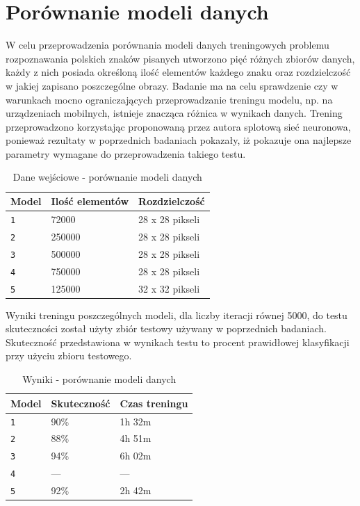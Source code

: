\documentclass[brudnopis]{xmgr}
\begin{document}
\section{Porównanie modeli danych}

W celu przeprowadzenia porównania modeli danych treningowych problemu rozpoznawania polskich znaków pisanych utworzono pięć różnych zbiorów danych, każdy z nich posiada określoną ilość elementów każdego znaku oraz rozdzielczość w jakiej zapisano poszczególne obrazy. Badanie ma na celu sprawdzenie czy w warunkach mocno ograniczających przeprowadzanie treningu modelu, np. na urządzeniach mobilnych, istnieje znacząca różnica w wynikach danych. Trening przeprowadzono korzystając proponowaną przez autora splotową sieć neuronowa, ponieważ rezultaty w poprzednich badaniach pokazały, iż pokazuje ona najlepsze parametry wymagane do przeprowadzenia takiego testu.

\begin{table}[!htb]
\begin{tabular}{|l|l|l|} \hline
Model & Ilość elementów & Rozdzielczość  \\ \hline
\texttt 1 & 72000 & 28 x 28 pikseli \\ \hline
\texttt 2 & 250000 & 28 x 28 pikseli \\ \hline
\texttt 3 & 500000 & 28 x 28 pikseli \\ \hline
\texttt 4 & 750000 & 28 x 28 pikseli \\ \hline
\texttt 5 & 125000 & 32 x 32 pikseli \\ \hline
\end{tabular}
\caption{Dane wejściowe - porównanie modeli danych}
\end{table}

Wyniki treningu poszczególnych modeli, dla liczby iteracji równej 5000, do testu skuteczności został użyty zbiór testowy używany w poprzednich badaniach. Skuteczność przedstawiona w wynikach testu to procent prawidłowej klasyfikacji przy użyciu zbioru testowego.

\begin{table}[!htb]
\begin{tabular}{|l|l|l|} \hline
Model & Skuteczność & Czas treningu  \\ \hline
\texttt 1 & 90\% & 1h 32m \\ \hline
\texttt 2 & 88\% & 4h 51m \\ \hline
\texttt 3 & 94\% & 6h 02m \\ \hline
\texttt 4 & --- & --- \\ \hline 
\texttt 5 & 92\% & 2h 42m \\ \hline
\end{tabular}
\caption{Wyniki - porównanie modeli danych}
\end{table}
\end{document}

